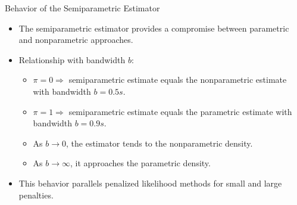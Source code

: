 \begin{frame}{Behavior of the Semiparametric Estimator}
\begin{itemize}
    \item The semiparametric estimator provides a compromise between parametric and nonparametric approaches.
    \item Relationship with bandwidth $b$:
    \begin{itemize}
        \item $\pi = 0 \Rightarrow$ semiparametric estimate equals the nonparametric estimate with bandwidth $b=0.5s$.
        \item $\pi = 1 \Rightarrow$ semiparametric estimate equals the parametric estimate with bandwidth $b=0.9s$.
        \item As $b \to 0$, the estimator tends to the nonparametric density.
        \item As $b \to \infty$, it approaches the parametric density.
    \end{itemize}
    \item This behavior parallels penalized likelihood methods for small and large penalties.
\end{itemize}
\end{frame}

